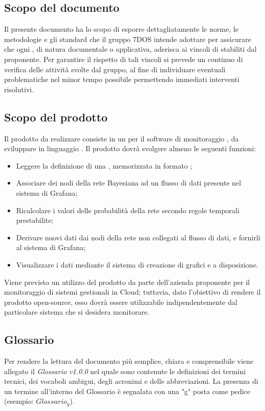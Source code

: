 \subsection{Scopo del documento}
Il presente documento ha lo scopo di esporre dettagliatamente le norme, le metodologie e gli standard che il gruppo 7DOS intende adottare per assicurare che ogni , di natura documentale o applicativa, aderisca ai vincoli di  stabiliti dal proponente. Per garantire il rispetto di tali vincoli si prevede un continuo  di verifica delle attività svolte dal gruppo, al fine di individuare eventuali problematiche nel minor tempo possibile permettendo immediati interventi risolutivi.
\subsection{Scopo del prodotto}
Il prodotto da realizzare consiste in un  per il software di monitoraggio , da sviluppare in linguaggio . Il prodotto dovrà svolgere almeno le seguenti funzioni:
\begin{itemize}
	\item{Leggere la definizione di una , memorizzata in formato ;}
	\item{Associare dei nodi della rete Bayesiana ad un flusso di dati presente nel sistema di Grafana;}
	\item{Ricalcolare i valori delle probabilità della rete secondo regole temporali prestabilite;}
	\item{Derivare nuovi dati dai nodi della rete non collegati al flusso di dati, e fornirli al sistema di Grafana;}
	\item{Visualizzare i dati mediante il sistema di creazione di grafici e  a disposizione.}
\end{itemize}
Viene previsto un utilizzo del prodotto da parte dell'azienda proponente per il monitoraggio di sistemi gestionali in Cloud; tuttavia, dato l'obiettivo di rendere il prodotto open-source, esso dovrà essere utilizzabile indipendentemente dal particolare sistema che si desidera monitorare.
\subsection{Glossario}
Per rendere la lettura del documento più semplice, chiara e comprensibile viene allegato il \emph{Glossario v1.0.0} nel quale sono contenute le definizioni dei termini tecnici, dei vocaboli ambigui, degli acronimi e delle abbreviazioni. La presenza di un termine all'interno del Glossario è segnalata con una "g" posta come pedice (esempio: $Glossario_{g}$).  
